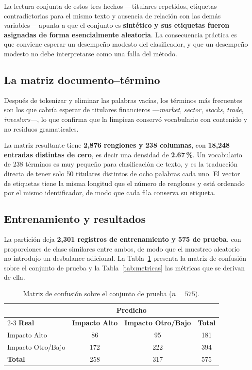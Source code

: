 \documentclass[11pt, a4paper]{article}
\begin{document}
La lectura conjunta de estos tres hechos —titulares repetidos, etiquetas contradictorias para el
mismo texto y ausencia de relación con las demás variables— apunta a que el conjunto es
\textbf{sintético y sus etiquetas fueron asignadas de forma esencialmente aleatoria}. La
consecuencia práctica es que conviene esperar un desempeño modesto del clasificador, y que un
desempeño modesto no debe interpretarse como una falla del método.

\subsection{La matriz documento--término}

Después de tokenizar y eliminar las palabras vacías, los términos más frecuentes son los que cabría
esperar de titulares financieros —\textit{market}, \textit{sector}, \textit{stocks},
\textit{trade}, \textit{investors}—, lo que confirma que la limpieza conservó vocabulario con
contenido y no residuos gramaticales.

La matriz resultante tiene \textbf{2{,}876 renglones y 238 columnas}, con \textbf{18{,}248 entradas
distintas de cero}, es decir una densidad de \textbf{2.67\,\%}. Un vocabulario de 238 términos es
muy pequeño para clasificación de texto, y es la traducción directa de tener solo 50 titulares
distintos de ocho palabras cada uno. El vector de etiquetas tiene la misma longitud que el número
de renglones y está ordenado por el mismo identificador, de modo que cada fila conserva su
etiqueta.

\subsection{Entrenamiento y resultados}

La partición deja \textbf{2{,}301 registros de entrenamiento y 575 de prueba}, con proporciones de
clase similares entre ambos, de modo que el muestreo aleatorio no introdujo un desbalance
adicional. La Tabla~\ref{tab:confusion} presenta la matriz de confusión sobre el conjunto de prueba
y la Tabla~\ref{tab:metricas} las métricas que se derivan de ella.

\begin{table}[H]
\centering
\caption{Matriz de confusión sobre el conjunto de prueba ($n = 575$).}
\label{tab:confusion}
\small
\renewcommand{\arraystretch}{1.2}
\begin{tabular}{l c c c}
\toprule
& \multicolumn{2}{c}{\textbf{Predicho}} & \\
\cmidrule(lr){2-3}
\textbf{Real} & \textbf{Impacto Alto} & \textbf{Impacto Otro/Bajo} & \textbf{Total} \\
\midrule
Impacto Alto      & 86  & 95  & 181 \\
Impacto Otro/Bajo & 172 & 222 & 394 \\
\midrule
\textbf{Total}    & 258 & 317 & 575 \\
\bottomrule
\end{tabular}
\end{table}
\end{document}
